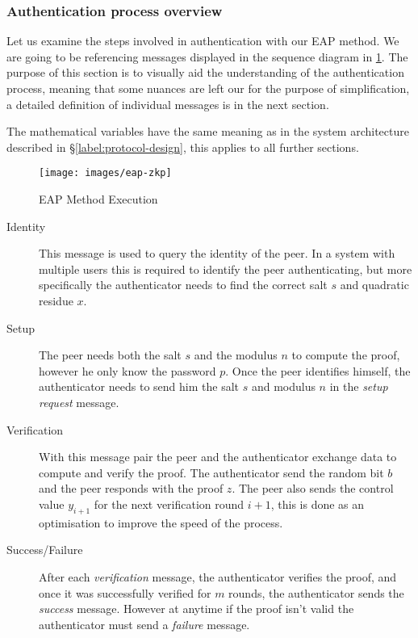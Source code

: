 \subsubsection{Authentication process overview}
Let us examine the steps involved in authentication with our EAP method. We are going to be referencing messages displayed in the sequence diagram in \ref{fig:eap-84}.
The purpose of this section is to visually aid the understanding of the authentication process, meaning that some nuances are left our for the purpose of simplification, a detailed definition of individual messages is in the next section.

The mathematical variables have the same meaning as in the system architecture described in \S\ref{label:protocol-design}, this applies to all further sections.

\begin{figure}[h!]
	\centering
	\texttt{[image: images/eap-zkp]}
	\caption{EAP Method Execution}
	\label{fig:eap-84}
\end{figure}

\newpage
\begin{description}
	\item [Identity] This message is used to query the identity of the peer. In a system with multiple users this is required to identify the peer authenticating, but more specifically the authenticator needs to find the correct salt $s$ and quadratic residue $x$. 
	\item [Setup] The peer needs both the salt $s$ and the modulus $n$ to compute the proof, however he only know the password $p$. Once the peer identifies himself, the authenticator needs to send him the salt $s$ and modulus $n$ in the \textit{setup request} message.
	\item [Verification] With this message pair the peer and the authenticator exchange data to compute and verify the proof. The authenticator send the random bit $b$ and the peer responds with the proof $z$. The peer also sends the control value $y_{i+1}$ for the next verification round $i+1$, this is done as an optimisation to improve the speed of the process.
	\item [Success/Failure] After each \textit{verification} message, the authenticator verifies the proof, and once it was successfully verified for $m$ rounds, the authenticator sends the \textit{success} message. However at anytime if the proof isn't valid the authenticator must send a \textit{failure} message.
\end{description}

